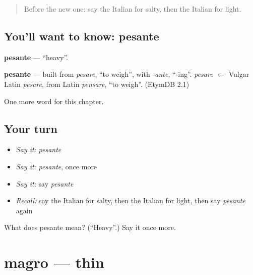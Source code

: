 \label{lesson:IT-C130-pesante}



\begin{quote}
Before the new one: say the Italian for salty, then the Italian for light.
\end{quote}

\subsection*{You'll want to know: pesante}
\textbf{pesante} — \textquotedblleft{}heavy\textquotedblright{}.

\begin{cousinweb}
\textbf{pesante} — built from \emph{pesare}, \textquotedblleft{}to weigh\textquotedblright{}, with \emph{-ante}, \textquotedblleft{}-ing\textquotedblright{}. \emph{pesare} $\leftarrow$ Vulgar Latin \emph{pesare}, from Latin \emph{pensare}, \textquotedblleft{}to weigh\textquotedblright{}. (EtymDB 2.1)
\end{cousinweb}

\begin{grammarlens}[title={What you've built}]
One more word for this chapter.
\end{grammarlens}

\subsection*{Your turn}
\begin{itemize}
\raggedright
  \item \emph{Say it:} \emph{pesante}
  \item \emph{Say it:} \emph{pesante}, once more
  \item \emph{Say it:} say \emph{pesante}
  \item \emph{Recall:} say the Italian for salty, then the Italian for light, then say \emph{pesante} again
\end{itemize}

\begin{tcolorbox}[breakable,colback=teal!4,colframe=teal!35!black,title={Before you move on}]
What does pesante mean? (\textquotedblleft{}Heavy\textquotedblright{}.) Say it once more.
\end{tcolorbox}
\section[magro]{magro — thin}

\label{lesson:IT-C130-magro}




